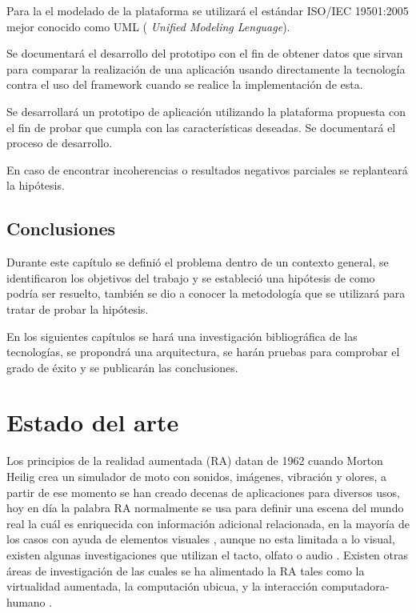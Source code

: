 \documentclass[12pt,a4paper,spanish,openany]{book}
\begin{document}
Para la el modelado de la plataforma se utilizará el estándar ISO/IEC 19501:2005
mejor conocido como UML ( \emph{Unified Modeling Lenguage}).

Se documentará  el desarrollo del prototipo con el fin de obtener
datos que sirvan para comparar la realización de una aplicación usando
directamente la tecnología contra el uso del framework cuando se realice la
implementación de esta.

Se desarrollará un  prototipo de aplicación utilizando la plataforma propuesta
con el fin de probar que cumpla con las características deseadas. Se documentará
el proceso de desarrollo.

En caso de encontrar incoherencias o resultados negativos parciales se
replanteará la hipótesis.


\section{Conclusiones}
Durante este capítulo se definió el problema dentro de un contexto general, se
identificaron los objetivos del trabajo y se estableció una hipótesis de como
podría ser resuelto, también se dio a conocer la metodología que se utilizará
para tratar de probar la hipótesis.

En los siguientes capítulos se hará una investigación bibliográfica de las
tecnologías, se propondrá una arquitectura, se harán pruebas para
comprobar el grado de éxito y se publicarán las conclusiones.





\chapter{Estado del arte}

Los principios de la realidad aumentada (RA) datan de 1962 cuando
Morton Heilig crea un simulador de moto con sonidos, imágenes, vibración y
olores, a partir de ese momento se han creado decenas de aplicaciones para
diversos usos, hoy en día la palabra RA normalmente se usa
para definir una escena del mundo real la cuál es enriquecida con información
adicional relacionada, en la mayoría de los casos con ayuda de elementos
visuales \cite{geopointer}, aunque no esta limitada a lo visual, existen
algunas investigaciones que utilizan el tacto,
olfato \cite{Kaye:2004:MSA:962342.964333} o  audio \cite{hat}. Existen otras
áreas de investigación de las cuales se ha alimentado la RA tales como la 
virtualidad aumentada, la computación ubicua, y la interacción
computadora-humano \cite{1698266}.
\end{document}
